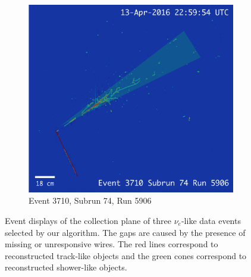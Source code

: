 \begin{figure}[htbp]
  \begin{subfigure}{0.45\textwidth}	
  \includegraphics[width=\linewidth]{figures/data1.png}
  \caption{Event 3710, Subrun 74, Run 5906}
\end{subfigure}

  \caption{Event displays of the collection plane of three $\nu_{e}$-like data events selected by our algorithm. The gaps are caused by the presence of missing or unresponsive wires. The red lines correspond to reconstructed track-like objects and the green cones correspond to reconstructed shower-like objects. }
  \label{fig:evds}
\end{figure}
